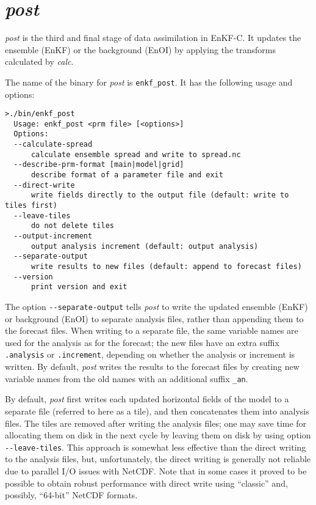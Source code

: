 \documentclass[11pt]{report}
\begin{document}
\section{\emph{post}}

\emph{post} is the third and final stage of data assimilation in EnKF-C.
It updates the ensemble (EnKF) or the background (EnOI) by applying the transforms calculated by \emph{calc}.

The name of the binary for \emph{post} is \verb|enkf_post|.
It has the following usage and options:
\begin{Verbatim}[frame=single,fontsize=\footnotesize]
>./bin/enkf_post
  Usage: enkf_post <prm file> [<options>]
  Options:
  --calculate-spread
      calculate ensemble spread and write to spread.nc
  --describe-prm-format [main|model|grid]
      describe format of a parameter file and exit
  --direct-write
      write fields directly to the output file (default: write to tiles first)
  --leave-tiles
      do not delete tiles
  --output-increment
      output analysis increment (default: output analysis)
  --separate-output
      write results to new files (default: append to forecast files)
  --version
      print version and exit
\end{Verbatim}

The option \verb|--separate-output| tells \emph{post} to write the updated ensemble (EnKF) or background (EnOI) to separate analysis files, rather than appending them to the forecast files.
When writing to a separate file, the same variable names are used for the analysis as for the forecast; the new files have an extra suffix \verb|.analysis| or \verb|.increment|, depending on whether the analysis or increment is written.
By default, \emph{post} writes the results to the forecast files by creating new variable names from the old names with an additional suffix \verb|_an|.

By default, \emph{post} first writes each updated horizontal fields of the model to a separate file (referred to here as a tile), and then concatenates them into analysis files.
The tiles are removed after writing the analysis files; one may save time for allocating them on disk in the next cycle by leaving them on disk by using option \verb|--leave-tiles|.
This approach is somewhat less effective than the direct writing to the analysis files, but, unfortunately, the direct writing is generally not reliable due to parallel I/O issues with NetCDF.
Note that in some cases it proved to be possible to obtain robust performance with direct write using ``classic'' and, possibly, ``64-bit'' NetCDF formats.
\end{document}
